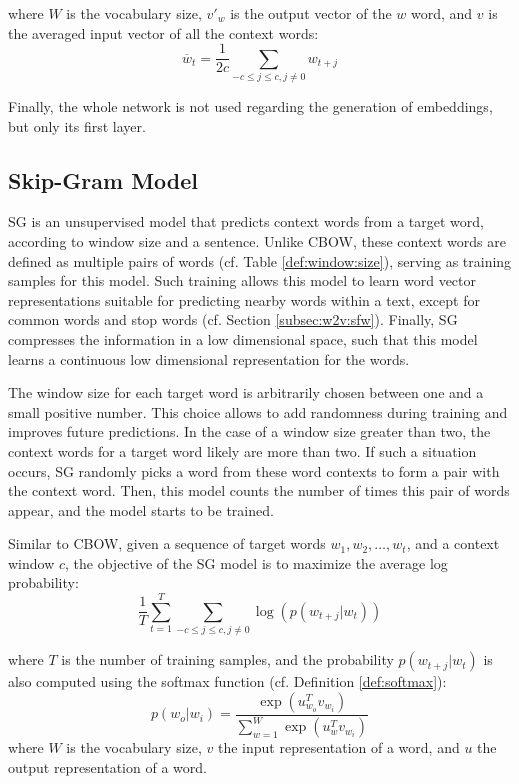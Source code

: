 where $W$ is the vocabulary size, $v'_w$ is the output vector of the $w$ word,
and $v$ is the averaged input vector of all the context words:
\begin{equation}
  \overline{w}_t = \frac{1}{2c}\sum_{-c\leq j \leq c,j \neq 0}w_{t + j}
  \label{eq:w2v:cbow:probability:details2}
\end{equation}

\noindent Finally, the whole network is not used regarding the generation of embeddings,
but only its first layer.

\subsection{Skip-Gram Model}
\label{subsec:w2v:sg}

SG is an unsupervised model that predicts context words from a target word,
according to window size and a sentence. Unlike CBOW, these context words are
defined as multiple pairs of words (cf. Table \ref{def:window:size}), serving as
training samples for this model. Such training allows this model to learn word
vector representations suitable for predicting nearby words within a text,
except for common words and stop words (cf. Section
\ref{subsec:w2v:sfw}). Finally, SG compresses the information in a low
dimensional space, such that this model learns a continuous low dimensional
representation for the words.

The window size for each target word is arbitrarily chosen between one and a
small positive number. This choice allows to add randomness during training and
improves future predictions. In the case of a window size greater than two, the
context words for a target word likely are more than two. If such a situation
occurs, SG randomly picks a word from these word contexts to form a pair with
the context word. Then, this model counts the number of times this pair of words
appear, and the model starts to be trained.

Similar to CBOW, given a sequence of target words $w_1, w_2, \ldots, w_t$, and a
context window $c$, the objective of the SG model is to maximize the average log
probability:
\begin{equation}
  \frac{1}{T}\sum_{t=1}^T\sum_{-c \leq j \leq c, j \neq 0}\log\left(p\left(w_{t+j}|w_t\right)\right)
  \label{eq:w2v:sg:probability}
\end{equation}

where $T$ is the number of training samples, and the probability $p\left(w_{t +
j}|w_t\right)$ is also computed using the softmax function (cf. Definition
\ref{def:softmax}):
\begin{equation}
  p\left(w_o|w_i\right) = \frac{\exp\left(u_{w_o}^Tv_{w_i}\right)}{\sum_{w=1}^W\exp\left(u_w^Tv_{w_i}\right)}
  \label{eq:w2v:sg:probability:details}
\end{equation}
where $W$ is the vocabulary size, $v$ the input representation of a word, and
$u$ the output representation of a word.

